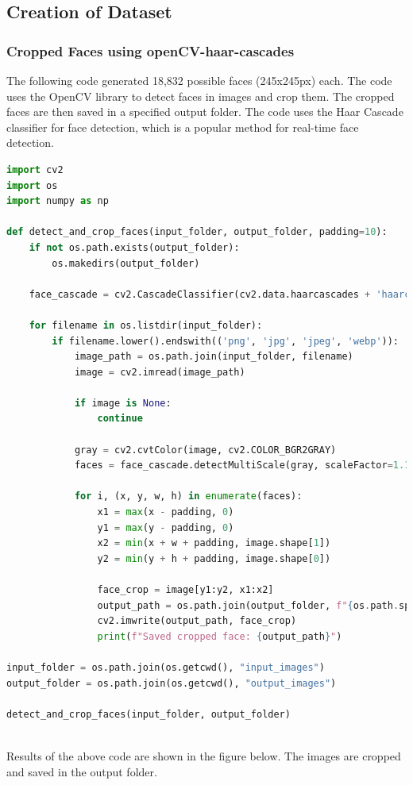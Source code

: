 \documentclass[openany]{report}
\begin{document}
\subsection{Creation of Dataset}
\subsubsection{Cropped Faces using openCV-haar-cascades}
The following code generated 18,832 possible faces (245x245px) each. The code uses the OpenCV library to detect faces in images and crop them. The cropped faces are then saved in a specified output folder. The code uses the Haar Cascade classifier for face detection, which is a popular method for real-time face detection. 
\begin{lstlisting}[language=Python]
import cv2
import os
import numpy as np

def detect_and_crop_faces(input_folder, output_folder, padding=10):
    if not os.path.exists(output_folder):
        os.makedirs(output_folder)
    
    face_cascade = cv2.CascadeClassifier(cv2.data.haarcascades + 'haarcascade_frontalface_default.xml')
    
    for filename in os.listdir(input_folder):
        if filename.lower().endswith(('png', 'jpg', 'jpeg', 'webp')):
            image_path = os.path.join(input_folder, filename)
            image = cv2.imread(image_path)
            
            if image is None:
                continue
            
            gray = cv2.cvtColor(image, cv2.COLOR_BGR2GRAY)
            faces = face_cascade.detectMultiScale(gray, scaleFactor=1.1, minNeighbors=5, minSize=(30, 30))
            
            for i, (x, y, w, h) in enumerate(faces):
                x1 = max(x - padding, 0)
                y1 = max(y - padding, 0)
                x2 = min(x + w + padding, image.shape[1])
                y2 = min(y + h + padding, image.shape[0])
                
                face_crop = image[y1:y2, x1:x2]
                output_path = os.path.join(output_folder, f"{os.path.splitext(filename)[0]}_face_{i}.jpg")
                cv2.imwrite(output_path, face_crop)
                print(f"Saved cropped face: {output_path}")

input_folder = os.path.join(os.getcwd(), "input_images")  
output_folder = os.path.join(os.getcwd(), "output_images") 

detect_and_crop_faces(input_folder, output_folder)
    
\end{lstlisting}
Results of the above code are shown in the figure below. The images are cropped and saved in the output folder.
\end{document}
